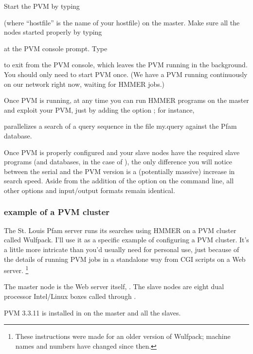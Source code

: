 Start the PVM by typing


(where ``hostfile'' is the name of your hostfile) on the master. Make
sure all the nodes started properly by typing 


at the PVM
console prompt.  Type 


to exit from the PVM console, which leaves the PVM running in the
background.  You should only need to start PVM once. (We have a PVM
running continuously on our network right now, waiting for HMMER
jobs.)

Once PVM is running, at any time you can run HMMER programs on the
master and exploit your PVM, just by adding the option ;
for instance,


parallelizes a search of a query sequence in the file my.query against
the Pfam database.

Once PVM is properly configured and your slave nodes have the required
slave programs (and databases, in the case of ), the
only difference you will notice between the serial and the PVM version
is a (potentially massive) increase in search speed. Aside from the
addition of the  option on the command line, all other
options and input/output formats remain identical.

\subsubsection{example of a PVM cluster}

The St. Louis Pfam server runs its searches using HMMER on a PVM
cluster called Wulfpack. I'll use it as a specific example of
configuring a PVM cluster. It's a little more intricate than you'd
usually need for personal use, just because of the details of running
PVM jobs in a standalone way from CGI scripts on a Web server.
\footnote{These instructions were made for an older version of
Wulfpack; machine names and numbers have changed since then.}

The master node is the Web server itself, . The slave
nodes are eight dual processor Intel/Linux boxes called 
through . 

PVM 3.3.11 is installed in  on the master and
all the slaves.

